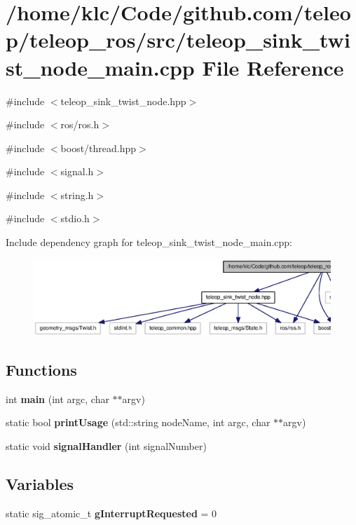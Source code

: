 \section{/home/klc/Code/github.com/teleop/teleop\_\-ros/src/teleop\_\-sink\_\-twist\_\-node\_\-main.cpp File Reference}
\label{teleop__sink__twist__node__main_8cpp}
{\ttfamily \#include $<$teleop\_\-sink\_\-twist\_\-node.hpp$>$}\par
{\ttfamily \#include $<$ros/ros.h$>$}\par
{\ttfamily \#include $<$boost/thread.hpp$>$}\par
{\ttfamily \#include $<$signal.h$>$}\par
{\ttfamily \#include $<$string.h$>$}\par
{\ttfamily \#include $<$stdio.h$>$}\par
Include dependency graph for teleop\_\-sink\_\-twist\_\-node\_\-main.cpp:
\nopagebreak
\begin{figure}[H]
\begin{center}
\leavevmode
\includegraphics[width=400pt]{teleop__sink__twist__node__main_8cpp__incl}
\end{center}
\end{figure}
\subsection*{Functions}
\begin{DoxyCompactItemize}
\item 
int {\bf main} (int argc, char $\ast$$\ast$argv)
\item 
static bool {\bf printUsage} (std::string nodeName, int argc, char $\ast$$\ast$argv)
\item 
static void {\bf signalHandler} (int signalNumber)
\end{DoxyCompactItemize}
\subsection*{Variables}
\begin{DoxyCompactItemize}
\item 
static sig\_\-atomic\_\-t {\bf gInterruptRequested} = 0
\end{DoxyCompactItemize}


